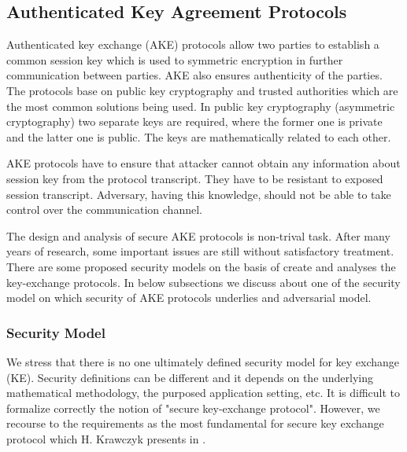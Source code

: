 \documentclass[11pt,titlepage]{article}
\theoremstyle{plain}
\begin{document}
\subsection{Authenticated Key Agreement Protocols}
Authenticated key exchange (AKE) protocols allow two parties to establish a common session key which is used to symmetric encryption in further communication between parties. AKE also ensures authenticity of the parties. The protocols base on public key cryptography and trusted authorities which are the most common solutions being used. In public key cryptography (asymmetric cryptography) two separate keys are required, where the former one is private and the latter one is public. The keys are mathematically related to each other.

\vspace{5mm}

AKE protocols have to ensure that attacker cannot obtain any information about session key from the protocol transcript. They have to be resistant to exposed session transcript. Adversary, having this knowledge, should not be able to take control over the communication channel.

\vspace{5mm}

The design and analysis of secure AKE protocols is non-trival task. After many years of research, some important issues are still without satisfactory treatment. There are some proposed security models on the basis of create and analyses the key-exchange protocols. In below subsections we discuss about one of the security model on which security of AKE protocols underlies and adversarial model. 

\subsubsection{Security Model}
We stress that there is no one ultimately defined security model for key exchange (KE). Security definitions can be different and it depends on the underlying mathematical methodology, the purposed application setting, etc. It is difficult to formalize correctly the notion of "secure key-exchange protocol". However, we recourse to the requirements as the most fundamental for secure key exchange protocol which H. Krawczyk presents in \cite{sign_mac}. 
\end{document}
